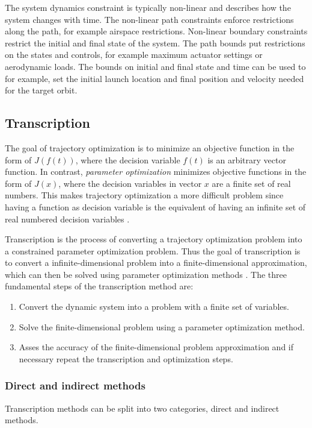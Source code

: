 The system dynamics constraint is typically non-linear and describes how the system changes with time. The non-linear path constraints enforce restrictions along the path, for example airspace restrictions. Non-linear boundary constraints restrict the initial and final state of the system. The path bounds put restrictions on the states and controls, for example maximum actuator settings or aerodynamic loads. The bounds on initial and final state and time can be used to for example, set the initial launch location and final position and velocity needed for the target orbit.

\subsection{Transcription}
The goal of trajectory optimization is to minimize an objective function in the form of $J(f(t))$, where the decision variable $f(t)$ is an arbitrary vector function. In contrast, \emph{parameter optimization} minimizes objective functions in the form of $J(x)$, where the decision variables in vector $x$ are a finite set of real numbers. This makes trajectory optimization a more difficult problem since having a function as decision variable is the equivalent of having an infinite set of real numbered decision variables \cite{kelly2017introduction}.

Transcription is the process of converting a trajectory optimization problem into a constrained parameter optimization problem. Thus the goal of transcription is to convert a infinite-dimensional problem into a finite-dimensional approximation, which can then be solved using parameter optimization methods \cite{betts2010practical}. The three fundamental steps of the transcription method are:

\begin{enumerate}
    \item Convert the dynamic system into a problem with a finite set of variables.
    \item Solve the finite-dimensional problem using a parameter optimization method.
    \item Asses the accuracy of the finite-dimensional problem approximation and if necessary repeat the transcription and optimization steps.
\end{enumerate}

\subsubsection{Direct and indirect methods}
Transcription methods can be split into two categories, direct and indirect methods.

